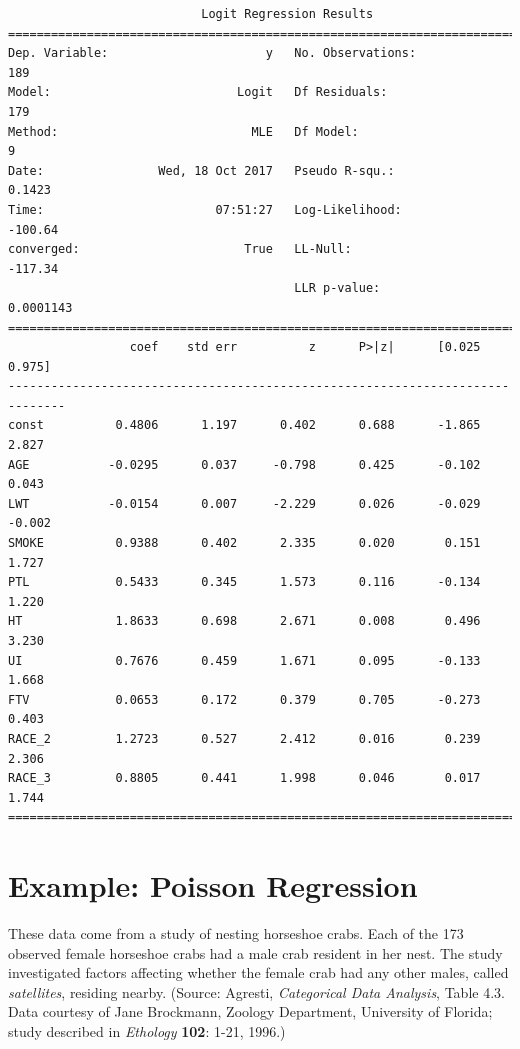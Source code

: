 {\small
\begin{verbatim}
                           Logit Regression Results                           
==============================================================================
Dep. Variable:                      y   No. Observations:                  189
Model:                          Logit   Df Residuals:                      179
Method:                           MLE   Df Model:                            9
Date:                Wed, 18 Oct 2017   Pseudo R-squ.:                  0.1423
Time:                        07:51:27   Log-Likelihood:                -100.64
converged:                       True   LL-Null:                       -117.34
                                        LLR p-value:                 0.0001143
==============================================================================
                 coef    std err          z      P>|z|      [0.025      0.975]
------------------------------------------------------------------------------
const          0.4806      1.197      0.402      0.688      -1.865       2.827
AGE           -0.0295      0.037     -0.798      0.425      -0.102       0.043
LWT           -0.0154      0.007     -2.229      0.026      -0.029      -0.002
SMOKE          0.9388      0.402      2.335      0.020       0.151       1.727
PTL            0.5433      0.345      1.573      0.116      -0.134       1.220
HT             1.8633      0.698      2.671      0.008       0.496       3.230
UI             0.7676      0.459      1.671      0.095      -0.133       1.668
FTV            0.0653      0.172      0.379      0.705      -0.273       0.403
RACE_2         1.2723      0.527      2.412      0.016       0.239       2.306
RACE_3         0.8805      0.441      1.998      0.046       0.017       1.744
==============================================================================
\end{verbatim}
}


\section*{Example: Poisson Regression}

These data come from a study of nesting horseshoe crabs. Each of the 173 observed female horseshoe crabs had a male crab resident in her nest. The study investigated factors affecting whether the female crab had any other males, called \emph{satellites}, residing nearby. (Source: Agresti, \emph{Categorical Data Analysis}, Table 4.3. Data courtesy of Jane Brockmann, Zoology Department, University of Florida; study described in \emph{Ethology} \textbf{102}: 1-21, 1996.)


